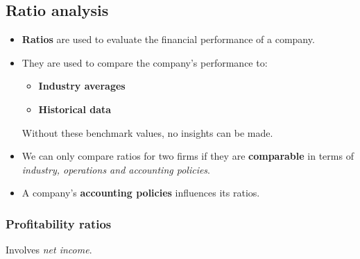 \normalsize

\subsection{Ratio analysis}

\begin{itemize}
    \item \textbf{Ratios} are used to evaluate the financial performance of a company.
    \item They are used to compare the company's performance to:
          \begin{itemize}
              \item \textbf{Industry averages}
              \item \textbf{Historical data}
          \end{itemize}
          Without these benchmark values, no insights can be made.
    \item We can only compare ratios for two firms if they are \textbf{comparable} in terms of \textit{industry, operations and accounting policies}.
    \item A company's \textbf{accounting policies} influences its ratios.
\end{itemize}

\subsubsection{Profitability ratios}

Involves \textit{net income}.

